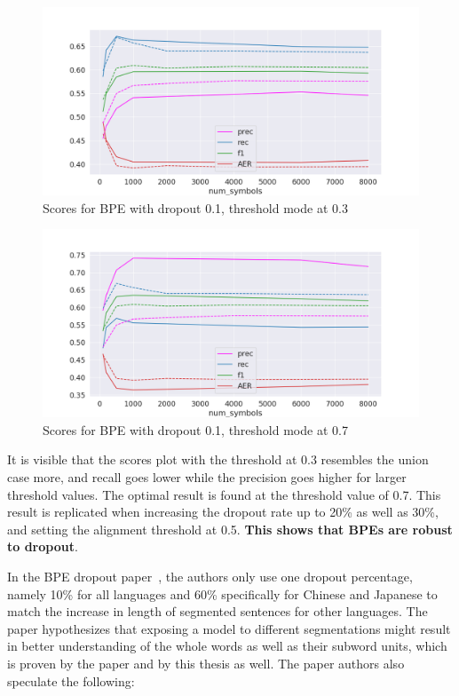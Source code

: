 \begin{figure}[!ht]
    \centering
    \includegraphics[width=11.5cm]{../reports/scores_dropout_bpe/space/0.1/0.3_thres_fastalign.png}
    \caption{Scores for BPE with dropout 0.1, threshold mode at 0.3}
\end{figure}

\begin{figure}[!ht]
    \centering
    \includegraphics[width=11.5cm]{../reports/scores_dropout_bpe/space/0.1/0.7_thres_fastalign.png}
    \caption{Scores for BPE with dropout 0.1, threshold mode at 0.7}
\end{figure}

It is visible that the scores plot with the threshold at 0.3 resembles the union case more, and recall goes lower while the precision goes higher for larger threshold values. The optimal result is found at the threshold value of 0.7. This result is replicated when increasing the dropout rate up to 20\% as well as 30\%, and setting the alignment threshold at 0.5. \textbf{This shows that BPEs are robust to dropout}.

In the BPE dropout paper~\cite{provilkov2019bpedropout}, the authors only use one dropout percentage, namely 10\% for all languages and 60\% specifically for Chinese and Japanese to match the increase in length of segmented sentences for other languages. The paper hypothesizes that exposing a model to different segmentations might result in better understanding of the whole words as well as their subword units, which is proven by the paper and by this thesis as well. The paper authors also speculate the following:

